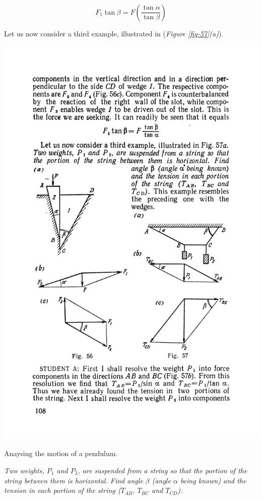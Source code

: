 \documentclass[a4paper,sfsidenotes]{tufte-book}
\begin{document}
\\
\begin{equation*}
F_{1} \tan \beta = F \left( \frac{\tan \alpha}{\tan \beta} \right)
\end{equation*}

Let us now consider a third example, illustrated in (\emph{Figure \ref{fig-57}(a)}). 
\begin{marginfigure}
\centering
\includegraphics[width=\linewidth]{fig-057a.pdf}
\caption{Anaysing the motion of a pendulum.}
\label{fig-57}
\end{marginfigure}
\emph{Two weights, $P_{1}$ and $P_{2}$, are suspended from a string so that the portion of the string between them is horizontal. Find angle $\beta$ (angle $\alpha$ being known) and the tension in each portion of the string ($T_{AB}$, $T_{BC}$ and $T_{CD}$).} 
\end{document}
